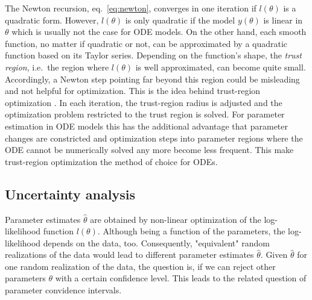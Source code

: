 \documentclass[article]{jss}
\begin{document}
The Newton recursion, eq.~\eqref{eq:newton}, converges in one iteration if $l(\theta)$ is a quadratic form. However, $l(\theta)$ is only quadratic if the model $y(\theta)$ is linear in $\theta$ which is usually not the case for ODE models. On the other hand, each smooth function, no matter if quadratic or not, can be approximated by a quadratic function based on its Taylor series. Depending on the function's shape, the \textit{trust region}, i.e.~the region where $l(\theta)$ is well approximated, can become quite small. Accordingly, a Newton step pointing far beyond this region could be misleading and not helpful for optimization. This is the idea behind trust-region optimization \citep{wright1999numerical}. In each iteration, the trust-region radius is adjusted and the optimization problem restricted to the trust region is solved. For parameter estimation in ODE models this has the additional advantage that parameter changes are constricted and optimization steps into parameter regions where the ODE cannot be numerically solved any more  become less frequent. This make trust-region optimization the method of choice for ODEs.




\subsection{Uncertainty analysis}

Parameter estimates $\hat \theta$  are obtained by non-linear optimization of the log-likelihood function $l(\theta)$. Although being a function of the parameters,  the log-likelihood depends on the data, too. Consequently, "equivalent" random realizations of the data would lead to different parameter estimates $\hat\theta$. Given $\hat\theta$ for one random realization of the data, the question is, if we can reject other parameters $\theta$ with a certain confidence level. This leads to the related question of parameter convidence intervals.
\end{document}
